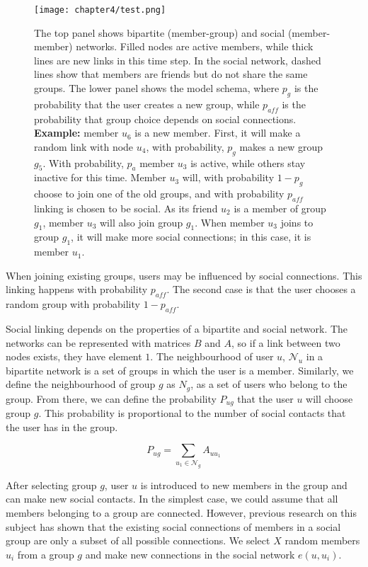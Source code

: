 \begin{figure}[h]
	\centering
	\texttt{[image: chapter4/test.png]}
	\caption[Bipartite groups growth model]{The top panel shows bipartite (member-group) and social (member-member) networks. Filled nodes are active members, while thick lines are new links in this time step. In the social network, dashed lines show that members are friends but do not share the same groups. The lower panel shows the model schema, where $p_g$ is the probability that the user creates a new group, while $p_{aff}$ is the probability that group choice depends on social connections. \textbf{Example:} member $u_6$ is a new member. First, it will make a random link with node $u_4$, with probability, $p_g$ makes a new group $g_5$. With probability, $p_a$ member $u_3$ is active, while others stay inactive for this time. Member $u_3$ will, with probability $1-p_g$ choose to join one of the old groups, and with probability $p_{aff}$ linking is chosen to be social. As its friend $u_2$ is a member of group $g_1$, member $u_3$ will also join group $g_1$. When member $u_3$ joins to group $g_1$, it will make more social connections; in this case, it is member $u_1$.}
	\label{fig:schema}
\end{figure}

When joining existing groups, users may be influenced by social connections. This linking happens with probability $p_{aff}$. The second case is that the user chooses a random group with probability $1-p_{aff}$. 

Social linking depends on the properties of a bipartite and social network. The networks can be represented with matrices $B$ and $A$, so if a link between two nodes exists, they have element $1$. The neighbourhood of user $u$, $\mathcal{N}_{u}$ in a bipartite network is a set of groups in which the user is a member. Similarly, we define the neighbourhood of group $g$ as $N_g$, as a set of users who belong to the group. From there, we can define the probability $ P_{ug}$ that the user $u$ will choose group $g$. This probability is proportional to the number of social contacts that the user has in the group. 

\begin{equation}
P_{ug}=\sum_{u_{1}\in \mathcal{N}_{g}} A_{uu_{1}} 
\label{eq1}
\end{equation}

After selecting group $g$, user $u$ is introduced to new members in the group and can make new social contacts. In the simplest case, we could assume that all members belonging to a group are connected. However, previous research on this subject \cite{ smiljanic2017associative, backstrom2006group, zheleva2009co} has shown that the existing social connections of members in a social group are only a subset of all possible connections. We select $X$ random members $u_i$ from a group $g$ and make new connections in the social network $e(u, u_i)$. 

